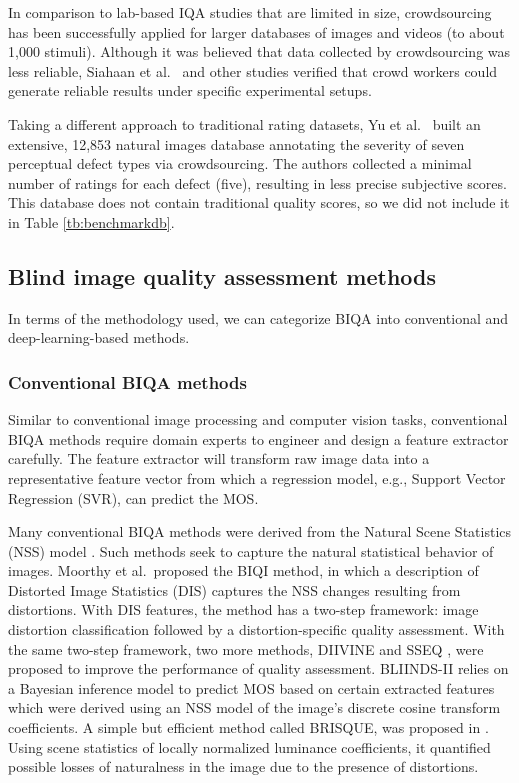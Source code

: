 \documentclass[10pt,journal,compsoc]{IEEEtran}
\begin{document}
In comparison to lab-based IQA studies that are limited in size, crowdsourcing has been successfully applied for larger databases of images \cite{ghadiyaram:2016massive} and videos \cite{hosu:2017konstanz} (to about 1,000 stimuli).  Although it was believed that data collected by crowdsourcing was less reliable, Siahaan et al.\ \cite{siahaan_reliable_2016} and other studies \cite{QoMEXReliability} verified that crowd workers could generate reliable results under specific experimental setups. 

Taking a different approach to traditional rating datasets, Yu et al.\ \cite{yu2018learning}  built an extensive, 12,853 natural images database annotating the severity of seven perceptual defect types via crowdsourcing. The authors collected a minimal number of ratings for each defect (five), resulting in less precise subjective scores. This database does not contain traditional quality scores, so we did not include it in Table \ref{tb:benchmarkdb}.





\subsection{Blind image quality assessment methods}
\label{sec:RelatedWorkBIQA}

In terms of the methodology used, we can categorize BIQA  into conventional and deep-learning-based methods.

\subsubsection{Conventional BIQA methods}
Similar to conventional image processing and computer vision tasks, conventional BIQA methods require domain experts to engineer and design a feature extractor carefully. The feature extractor will transform raw image data into a representative feature vector from which a regression model, e.g., Support Vector Regression (SVR), can predict the MOS. 

Many conventional BIQA methods were derived from the Natural Scene Statistics (NSS) model \cite{srivastava2003advances}. Such methods seek to capture the natural statistical behavior of images. Moorthy et al.\ proposed the BIQI \cite{Moorthy:2010} method, in which a description of Distorted Image Statistics (DIS) captures the NSS changes resulting from distortions. With DIS features, the method has a two-step framework: image distortion classification followed by a distortion-specific quality assessment. With the same two-step framework, two more methods, DIIVINE \cite{Moorthy:2011} and SSEQ \cite{Liu:2014b}, were proposed to improve the performance of quality assessment.
BLIINDS-II \cite{blind2} relies on a Bayesian inference model to predict MOS based on certain extracted features which were derived using an NSS model of the image's discrete cosine transform coefficients. A simple but efficient method called BRISQUE, was proposed in \cite{bris}. Using scene statistics of locally normalized luminance coefficients, it quantified possible losses of naturalness in the image due to the presence of distortions.
\end{document}
